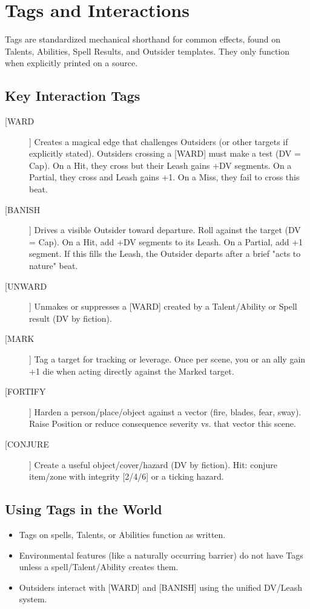 \section{Tags and Interactions}

Tags are standardized mechanical shorthand for common effects, found on Talents, Abilities, Spell Results, and Outsider templates. They only function when explicitly printed on a source.

\subsection*{Key Interaction Tags}

\begin{description}
  \item[[WARD]]  Creates a magical edge that challenges Outsiders (or other targets if explicitly stated). Outsiders crossing a [WARD] must make a test (DV = Cap). On a Hit, they cross but their Leash gains +DV segments. On a Partial, they cross and Leash gains +1. On a Miss, they fail to cross this beat.
  \item[[BANISH]]  Drives a visible Outsider toward departure. Roll against the target (DV = Cap). On a Hit, add +DV segments to its Leash. On a Partial, add +1 segment. If this fills the Leash, the Outsider departs after a brief "acts to nature" beat.
  \item[[UNWARD]]  Unmakes or suppresses a [WARD] created by a Talent/Ability or Spell result (DV by fiction).
  \item[[MARK]]  Tag a target for tracking or leverage. Once per scene, you or an ally gain +1 die when acting directly against the Marked target.
  \item[[FORTIFY]]  Harden a person/place/object against a vector (fire, blades, fear, sway). Raise Position or reduce consequence severity vs. that vector this scene.
  \item[[CONJURE]]  Create a useful object/cover/hazard (DV by fiction). Hit: conjure item/zone with integrity [2/4/6] or a ticking hazard.
\end{description}

\subsection*{Using Tags in the World}
\begin{itemize}
  \item Tags on spells, Talents, or Abilities function as written.
  \item Environmental features (like a naturally occurring barrier) do not have Tags unless a spell/Talent/Ability creates them.
  \item Outsiders interact with [WARD] and [BANISH] using the unified DV/Leash system.
\end{itemize}

